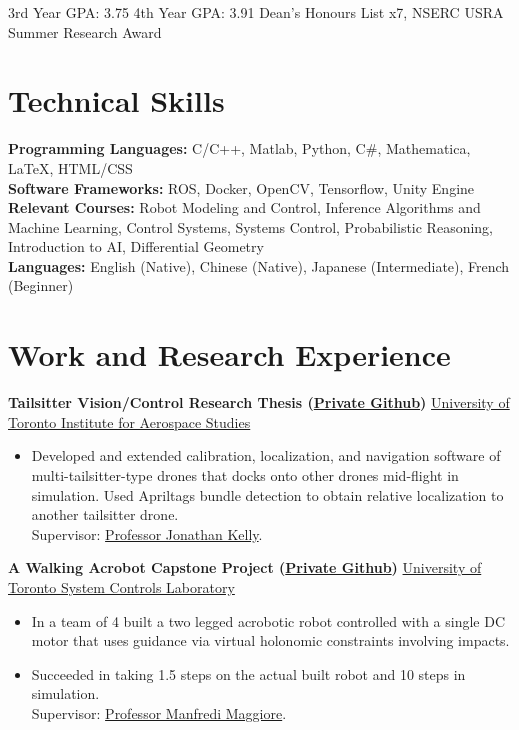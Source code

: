 \documentclass[10pt, a4paper]{cv}
\begin{document}
\small{
	3rd Year GPA: 3.75\hspace{1em}
	4th Year GPA: 3.91\hspace{1em}
\small Dean's Honours List x7, NSERC USRA Summer Research Award

\section*{Technical Skills}
\textbf{Programming Languages:} C/C++, Matlab, Python, C\#, Mathematica, \LaTeX, HTML/CSS\\[0.2em]
\textbf{Software Frameworks:} ROS, Docker, OpenCV, Tensorflow, Unity Engine\\[0.2em]
\textbf{Relevant Courses:} Robot Modeling and Control, Inference Algorithms and Machine Learning, Control Systems, Systems Control, Probabilistic Reasoning, Introduction to AI, Differential Geometry \\
\textbf{Languages:} English (Native), Chinese (Native), Japanese (Intermediate), French (Beginner)
\section*{Work and Research Experience}\noindent
	\textbf{Tailsitter Vision/Control Research Thesis (\href{https://github.com/utiasSTARS/PhoenixDrone}{Private Github})} \hfill \href{http://www.starslab.ca}{University of Toronto Institute for Aerospace Studies}
	\begin{itemize}
	\item Developed and extended calibration, localization, and navigation software of multi-tailsitter-type drones that docks onto other drones mid-flight in simulation. Used Apriltags bundle detection to obtain relative localization to another tailsitter drone. \\Supervisor: \href{http://stars.utias.utoronto.ca/~jkelly/}{Professor Jonathan Kelly}.
	\end{itemize}

	\textbf{A Walking Acrobot  Capstone Project (\href{https://github.com/Vuwij/acrobot}{Private Github})} \hfill \href{https://www.control.utoronto.ca/}{University of Toronto System Controls Laboratory}
	\begin{itemize}
		\item In a team of 4 built a two legged acrobotic robot controlled with a single DC motor that uses guidance via virtual holonomic constraints involving impacts.
		\item Succeeded in taking 1.5 steps on the actual built robot and 10 steps in simulation.\\ Supervisor: \href{https://www.control.utoronto.ca/~maggiore/}{Professor Manfredi Maggiore}.
	\end{itemize}

}
\end{document}
